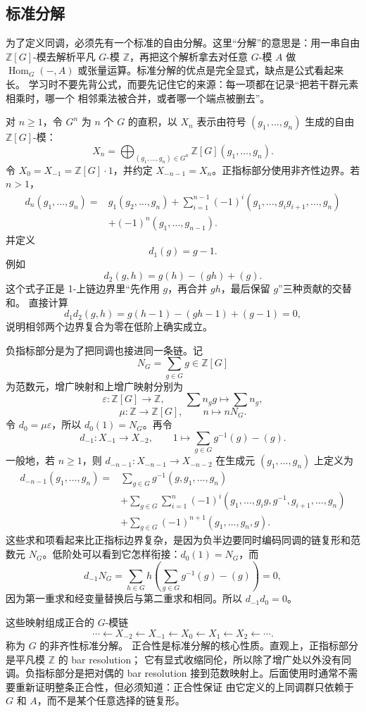 \documentclass[11pt,a4paper,openany]{ctexbook}
\numberwithin{equation}{chapter}
\newcommand{\Z}{\mathbb{Z}}
\theoremstyle{plain}
\theoremstyle{definition}
\theoremstyle{remark}
\begin{document}
\subsection{标准分解}

为了定义同调，必须先有一个标准的自由分解。这里“分解”的意思是：用一串自由
$\Z[G]$-模去解析平凡 $G$-模 $\Z$，再把这个解析拿去对任意 $G$-模 $A$ 做
$\operatorname{Hom}_G(-,A)$ 或张量运算。标准分解的优点是完全显式，缺点是公式看起来长。
学习时不要先背公式，而要先记住它的来源：每一项都在记录“把若干群元素相乘时，哪一个
相邻乘法被合并，或者哪一个端点被删去”。

对 $n\ge1$，令 $G^n$ 为 $n$ 个 $G$ 的直积，以 $X_n$ 表示由符号
$(g_1,\ldots,g_n)$ 生成的自由 $\Z[G]$-模：
\[
 X_n=\bigoplus_{(g_1,\ldots,g_n)\in G^n}\Z[G](g_1,\ldots,g_n).
\]
令 $X_0=X_{-1}=\Z[G]\cdot1$，并约定 $X_{-n-1}=X_n$。正指标部分使用非齐性边界。若 $n>1$，
\[
\begin{aligned}
d_n(g_1,\ldots,g_n)
={}&g_1(g_2,\ldots,g_n)
 +\sum_{i=1}^{n-1}(-1)^i(g_1,\ldots,g_ig_{i+1},\ldots,g_n)\\
&+(-1)^n(g_1,\ldots,g_{n-1}).
\end{aligned}
\]
并定义
\[
 d_1(g)=g-1.
\]
例如
\[
d_2(g,h)=g(h)-(gh)+(g).
\]
这个式子正是 1-上链边界里“先作用 $g$，再合并 $gh$，最后保留 $g$”三种贡献的交替和。
直接计算
\[
d_1d_2(g,h)=g(h-1)-(gh-1)+(g-1)=0,
\]
说明相邻两个边界复合为零在低阶上确实成立。

负指标部分是为了把同调也接进同一条链。记
\[
 N_G=\sum_{g\in G}g\in \Z[G]
\]
为范数元，增广映射和上增广映射分别为
\[
 \varepsilon:\Z[G]\to\Z,\qquad \sum n_gg\mapsto \sum n_g,
\]
\[
 \mu:\Z\to\Z[G],\qquad n\mapsto nN_G.
\]
令 $d_0=\mu\varepsilon$，所以 $d_0(1)=N_G$。再令
\[
 d_{-1}:X_{-1}\to X_{-2},\qquad
 1\mapsto \sum_{g\in G}g^{-1}(g)-(g).
\]
一般地，若 $n\ge1$，则 $d_{-n-1}:X_{-n-1}\to X_{-n-2}$ 在生成元
$(g_1,\ldots,g_n)$ 上定义为
\[
\begin{aligned}
d_{-n-1}(g_1,\ldots,g_n)
={}&\sum_{g\in G}g^{-1}(g,g_1,\ldots,g_n)\\
&+\sum_{g\in G}\sum_{i=1}^n(-1)^i
(g_1,\ldots,g_ig,g^{-1},g_{i+1},\ldots,g_n)\\
&+\sum_{g\in G}(-1)^{n+1}(g_1,\ldots,g_n,g).
\end{aligned}
\]
这些求和项看起来比正指标边界复杂，是因为负半边要同时编码同调的链复形和范数元
$N_G$。低阶处可以看到它怎样衔接：$d_0(1)=N_G$，而
\[
d_{-1}N_G
=\sum_{h\in G}h\left(\sum_{g\in G}g^{-1}(g)-(g)\right)=0,
\]
因为第一重求和经变量替换后与第二重求和相同。所以 $d_{-1}d_0=0$。

这些映射组成正合的 $G$-模链
\[
 \cdots\leftarrow X_{-2}\leftarrow X_{-1}\leftarrow X_0
 \leftarrow X_1\leftarrow X_2\leftarrow\cdots.
\]
称为 $G$ 的非齐性标准分解。
正合性是标准分解的核心性质。直观上，正指标部分是平凡模 $\Z$ 的 bar resolution；
它有显式收缩同伦，所以除了增广处以外没有同调。负指标部分是把对偶的 bar resolution
接到范数映射上。后面使用时通常不需要重新证明整条正合性，但必须知道：正合性保证
由它定义的上同调群只依赖于 $G$ 和 $A$，而不是某个任意选择的链复形。
\end{document}
